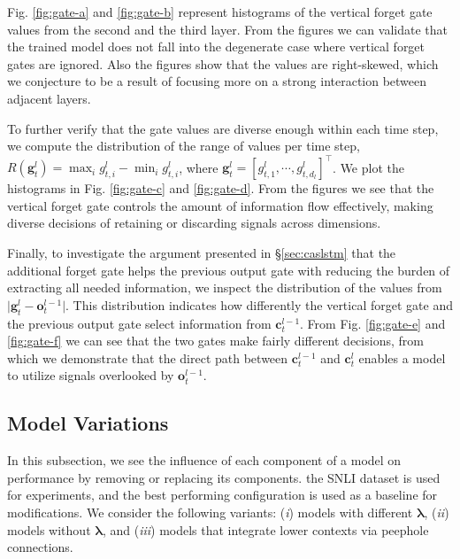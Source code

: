 \documentclass[wcp]{jmlr}
\begin{document}
    Fig. \ref{fig:gate-a} and \ref{fig:gate-b} represent histograms of the vertical forget gate values from the second and the third layer.
    From the figures we can validate that the trained model does not fall into the degenerate case where vertical forget gates are ignored.
    Also the figures show that the values are right-skewed, which we conjecture to be a result of focusing more on a strong interaction between adjacent layers.
    
    To further verify that the gate values are diverse enough within each time step, we compute the distribution of the range of values per time step, $R(\mathbf{g}_t^l)=\max_i{g_{t,i}^l} - \min_i{{g}_{t,i}^l}$, where $\mathbf{g}_t^l=[g_{t,1}^l, \cdots, g_{t,d_l}^l]^\top$.
    We plot the histograms in Fig. \ref{fig:gate-c} and \ref{fig:gate-d}.
    From the figures we see that the vertical forget gate controls the amount of information flow effectively, making diverse decisions of retaining or discarding signals across dimensions.
    
    Finally, to investigate the argument presented in \S\ref{sec:caslstm} that the additional forget gate helps the previous output gate with reducing the burden of extracting all needed information, we inspect the distribution of the values from $\vert \mathbf{g}_t^l - \mathbf{o}_t^{l-1} \vert$.
    This distribution indicates how differently the vertical forget gate and the previous output gate select information from $\mathbf{c}_t^{l-1}$.
    From Fig. \ref{fig:gate-e} and \ref{fig:gate-f} we can see that the two gates make fairly different decisions, from which we demonstrate that the direct path between $\mathbf{c}_t^{l-1}$ and $\mathbf{c}_t^l$ enables a model to utilize signals overlooked by $\mathbf{o}_t^{l-1}$.
    
    \subsection{Model Variations}
    \label{exp:variations}
     
    In this subsection, we see the influence of each component of a model on performance by removing or replacing its components.
    the SNLI dataset is used for experiments, and the best performing configuration is used as a baseline for modifications.
    We consider the following variants: (\textit{i}) models with different $\bm\lambda$, (\textit{ii}) models without $\bm\lambda$, and (\textit{iii}) models that integrate lower contexts via peephole connections.
    
\end{document}
